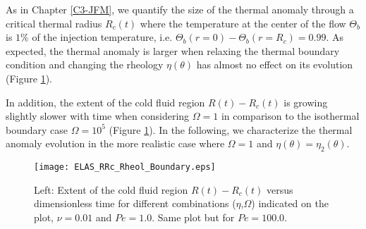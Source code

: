 As  in Chapter  \ref{C3-JFM},  we  quantify the  size  of the  thermal
anomaly  through   a  critical  thermal  radius   $R_c(t)$  where  the
temperature  at the  center of  the flow  $\Theta_b$ is  $1\%$ of  the
injection temperature,  i.e.  $\Theta_b(r=0)-\Theta_b(r=R_c)=0.99$. As
expected,  the thermal  anomaly is  larger when  relaxing the  thermal
boundary condition and changing the rheology $\eta(\theta)$ has almost
no        effect        on         its        evolution        (Figure
\ref{C4-ELAS_RRc_Rheol_Boundary}). 

In  addition, the  extent of  the cold  fluid region  $R(t)-R_c(t)$ is
growing  slightly  slower with  time  when  considering $\Omega=1$  in
comparison  to  the  isothermal boundary  case  $\Omega=10^5$  (Figure
\ref{C4-ELAS_RRc_Rheol_Boundary}).  In the  following, we characterize
the  thermal  anomaly  evolution  in the  more  realistic  case  where
$\Omega=1$ and $\eta(\theta)=\eta_2(\theta)$.

\begin{figure}[h!]
  \begin{center}
    \graphicspath{ {/Users/thorey/Documents/These/Projet/Refroidissement/Skin_Model/Figure/Figure_Heating/} }
    \texttt{[image: ELAS\_RRc\_Rheol\_Boundary.eps]}
    \caption{Left:  Extent  of  the cold  fluid  region  $R(t)-R_c(t)$
      versus   dimensionless    time   for    different   combinations
      ($\eta$,$\Omega$)   indicated  on   the  plot,   $\nu=0.01$  and
      $Pe=1.0$. Same plot but for $Pe=100.0$.}
    \label{C4-ELAS_RRc_Rheol_Boundary}
  \end{center}
\end{figure}

